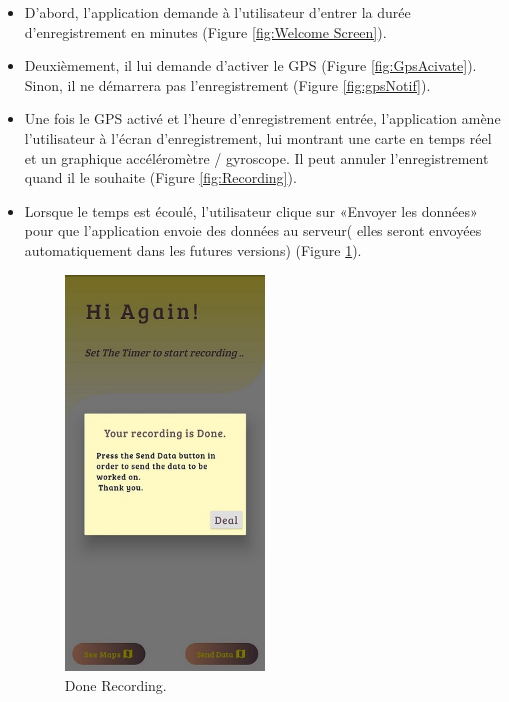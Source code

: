 \begin{itemize}
    \item D'abord, l'application demande à l'utilisateur d'entrer la durée d'enregistrement en minutes (Figure \ref{fig:Welcome Screen}).
          
    \item Deuxièmement, il lui demande d'activer le GPS (Figure \ref{fig:GpsAcivate}). Sinon, il ne démarrera pas l'enregistrement (Figure \ref{fig:gpsNotif}).
     



    \item Une fois le GPS activé et l'heure d'enregistrement entrée, l'application amène l'utilisateur à l'écran d'enregistrement, lui montrant une carte en temps réel et un graphique accéléromètre / gyroscope. Il peut annuler l'enregistrement quand il le souhaite (Figure \ref{fig:Recording}).
    
 

   

    \item Lorsque le temps est écoulé, l’utilisateur clique sur «Envoyer les données» pour que l’application envoie des données au serveur( elles seront envoyées automatiquement dans les futures versions) (Figure \ref{fig:Done}).
          \begin{figure}[h!]
              \center
              \includegraphics[width=0.50\textwidth]{Images/recordingApp/doneRecording.jpg}
              \caption{Done Recording.}
              \label{fig:Done}
          \end{figure}


\end{itemize}
